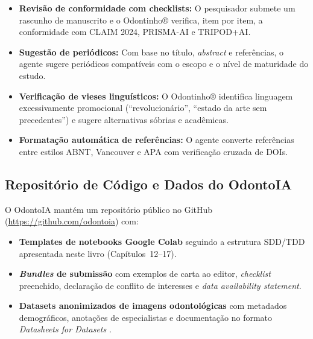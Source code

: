 \begin{itemize}
  \item \textbf{Revisão de conformidade com checklists:} O pesquisador submete
    um rascunho de manuscrito e o Odontinho® verifica, item por item, a
    conformidade com CLAIM 2024, PRISMA-AI e TRIPOD+AI.
  \item \textbf{Sugestão de periódicos:} Com base no título, \textit{abstract} e
    referências, o agente sugere periódicos compatíveis com o escopo e o nível
    de maturidade do estudo.
  \item \textbf{Verificação de vieses linguísticos:} O Odontinho® identifica
    linguagem excessivamente promocional (``revolucionário'', ``estado da arte
    sem precedentes'') e sugere alternativas sóbrias e acadêmicas.
  \item \textbf{Formatação automática de referências:} O agente converte
    referências entre estilos ABNT, Vancouver e APA com verificação cruzada de
    DOIs.
\end{itemize}

\subsection{Repositório de Código e Dados do OdontoIA}

O OdontoIA mantém um repositório público no GitHub
(\url{https://github.com/odontoia}) com:

\begin{itemize}
  \item \textbf{Templates de notebooks Google Colab} seguindo a estrutura
    SDD/TDD apresentada neste livro (Capítulos~12--17).
  \item \textbf{\textit{Bundles} de submissão} com exemplos de carta ao editor,
    \textit{checklist} preenchido, declaração de conflito de interesses e
    \textit{data availability statement}.
  \item \textbf{Datasets anonimizados de imagens odontológicas} com metadados
    demográficos, anotações de especialistas e documentação no formato
    \textit{Datasheets for Datasets} \cite{gebru2021datasheets}.
\end{itemize}

